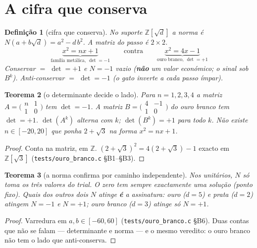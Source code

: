 \documentclass[11pt,a4paper]{article}
\newcommand{\code}[1]{\texttt{\small #1}}
\newtheorem{teorema}{Teorema}
\newtheorem{definicao}[teorema]{Definição}
\begin{document}
\section{A cifra que conserva}\label{cripto:cifra}

\begin{definicao}[cifra que conserva]\label{cripto:def:cifra-conserva}
No suporte $\mathbb{Z}[\sqrt d]$ a norma é $N(a+b\sqrt d)=a^{2}-d\,b^{2}$.
A matriz do passo é $2\times2$.
\[
\boxed{\;
\underbrace{x^{2}=nx+1}_{\text{família metálica},\ \det=-1}
\qquad\text{contra}\qquad
\underbrace{x^{2}=4x-1}_{\text{ouro branco},\ \det=+1}
\;}
\]
Conservar $=$ $\det=+1$ e $N=-1$ vazio
(\textbf{não} um valor económico; o sinal sob $B^{k}$).
Anti-conservar $=$ $\det=-1$ (o gato inverte a cada passo ímpar).
\end{definicao}

\begin{teorema}[o determinante decide o lado]\label{cripto:thm:det}
Para $n=1,2,3,4$ a matriz $A=\bigl(\begin{smallmatrix}n&1\\1&0\end{smallmatrix}\bigr)$
tem $\det=-1$.
A matriz $B=\bigl(\begin{smallmatrix}4&-1\\1&0\end{smallmatrix}\bigr)$
do ouro branco tem $\det=+1$.
$\det(A^{k})$ alterna com $k$; $\det(B^{k})=+1$ para todo $k$.
Não existe $n\in[-20,20]$ que ponha $2+\sqrt3$ na forma $x^{2}=nx+1$.
\end{teorema}

\begin{proof}
Conta na matriz, em $\mathbb{Z}$.
$(2+\sqrt3)^{2}=4(2+\sqrt3)-1$ exacto em $\mathbb{Z}[\sqrt3]$
(\code{tests/ouro\_branco.c} §B1--§B3).
\end{proof}

\begin{teorema}[a norma confirma por caminho independente]\label{cripto:thm:norma}
Nos unitários, $N$ só toma os três valores do trial.
O zero tem sempre exactamente uma solução (ponto fixo).
Quais dos outros dois $N$ atinge \textbf{é} a assinatura:
ouro ($d=5$) e prata ($d=2$) atingem $N=-1$ e $N=+1$;
ouro branco ($d=3$) atinge só $N=+1$.
\end{teorema}

\begin{proof}
Varredura em $a,b\in[-60,60]$
(\code{tests/ouro\_branco.c} §B6).
Duas contas que não se falam --- determinante e norma --- e o mesmo
veredito: o ouro branco não tem o lado que anti-conserva.
\end{proof}
\end{document}

